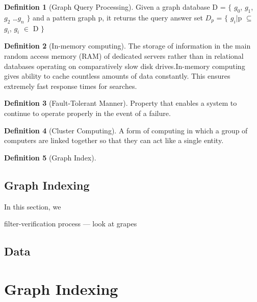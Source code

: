 \documentclass{l4proj}
\theoremstyle{definition}
\newtheorem{myDef}{Definition}
\begin{document}
        \begin{myDef}[Graph Query Processing]
        \label{def:graphQueryProcessing}
        Given a graph database D = $\{$ $g^{}_0$, $g^{}_1$, $g^{}_2$ \ldots $g^{}_n$ $\}$ and a pattern graph p, it returns the query answer set $D^{}_p$ = $\{$ $g^{}_i$$\vert$p $\subseteq$ $g^{}_i$, $g^{}_i$ $\in$ D $\}$
        
        \end{myDef}
        
        \begin{myDef}[In-memory computing]
        The storage of information in the main random access memory (RAM) of dedicated servers rather than in relational databases operating on comparatively slow disk drives.In-memory computing gives ability to cache countless amounts of data constantly. This ensures extremely fast response times for searches.
        \end{myDef}
        
        \begin{myDef} [Fault-Tolerant Manner] 
        Property that enables a system to continue to operate properly in the event of a failure.
        \end{myDef}
        
        \begin{myDef} [Cluster Computing]
        A form of computing in which a group of computers are linked together so that they can act like a single entity. 
        \end{myDef}
        
        \begin{myDef} [Graph Index]
		
		\end{myDef}
        
    \section{Graph Indexing}
        In this section, we  
        
        filter-verification process --- look at grapes
        
    \section{Data}

        
\chapter{Graph Indexing}
\end{document}

